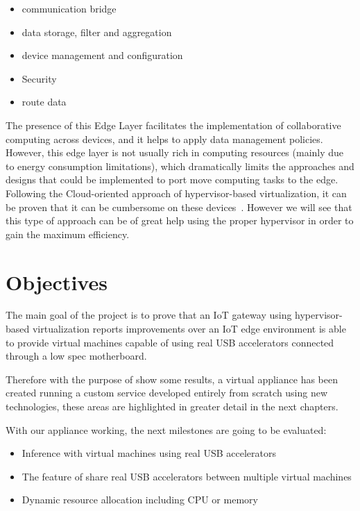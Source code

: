 \begin{itemize}
  \item communication bridge
  \item data storage, filter and aggregation
  \item device management and configuration
  \item Security 
  \item route data
\end{itemize}

The presence of this Edge Layer facilitates the implementation of collaborative computing across devices, and it helps to apply data management policies. However, this edge layer is not usually rich in computing resources (mainly due to energy consumption limitations), which dramatically limits the approaches and designs that could be implemented to port move computing tasks to the edge. Following the Cloud-oriented approach of hypervisor-based virtualization, it can be proven that it can be cumbersome on these devices~\cite{arxiv:doluikiraly:2018}.
However we will see that this type of approach can be of great help using the proper hypervisor in order to gain the maximum efficiency.

\newpage
\section{Objectives}
\label{makereference1.2}

The main goal of the project is to prove that an IoT gateway using hypervisor-based virtualization reports improvements over an IoT edge environment is able to provide virtual machines capable of using real USB accelerators connected through a low spec motherboard.

Therefore with the purpose of show some results, a virtual appliance has been created running a custom service developed entirely from scratch using new technologies, these areas are highlighted in greater detail in the next chapters. 

With our appliance working, the next milestones are going to be evaluated:

\begin{itemize}
  \item Inference with virtual machines using real USB accelerators
  \item The feature of share real USB accelerators between multiple virtual machines
  \item Dynamic resource allocation including CPU or memory 
\end{itemize}


